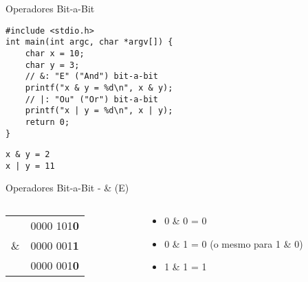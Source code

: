 \documentclass[t, aspectratio=169]{beamer}
\begin{document}
\begin{frame}[label={sec:orgb4c59b5},fragile]{Operadores Bit-a-Bit}
 \vspace{-0.5cm}
\begin{verbatim}
#include <stdio.h>
int main(int argc, char *argv[]) {
    char x = 10;
    char y = 3;
    // &: "E" ("And") bit-a-bit
    printf("x & y = %d\n", x & y);
    // |: "Ou" ("Or") bit-a-bit
    printf("x | y = %d\n", x | y);
    return 0;
}
\end{verbatim}

\begin{verbatim}
x & y = 2
x | y = 11
\end{verbatim}
\end{frame}

\begin{frame}[label={sec:orgff876ce}]{Operadores Bit-a-Bit - \& (E)}
\begin{columns}
\begin{column}{0.5\columnwidth}
\begin{center}
\begin{tabular}{cc}
 & 0000 101\bfseries\color{highlight}0\\
\& & 0000 001\bfseries\color{highlight}1\\
\hline
 & 0000 001\bfseries\color{highlight}0\\
\end{tabular}
\end{center}
\end{column}

\begin{column}{0.5\columnwidth}
\begin{itemize}
\item \alert{\color{highlight}0 \& 0 = 0}
\item 0 \& 1 = 0 (o mesmo para 1 \& 0)
\item 1 \& 1 = 1
\end{itemize}
\end{column}
\end{columns}
\end{frame}
\end{document}
